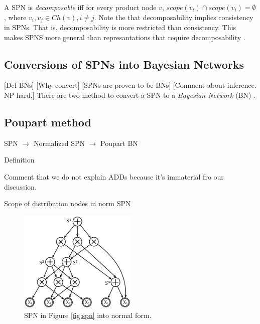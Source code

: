 A SPN is \emph{decomposable} \cite{poon2011sum} iff for every product node $v$, $scope(v_i) \cap scope(v_i) = \emptyset$, where $v_i,v_j \in Ch(v), i\neq j$. 
Note the that decomposability implies consistency in SPNs.
That is, decomposability is more restricted than consistency.
This makes SPNS more general than represantations that require decomposability \cite{poon2011sum}.

\subsection{Conversions of SPNs into Bayesian Networks}

[Def BNs]
[Why convert]
[SPNs are proven to be BNs]
[Comment about inference. NP hard.]
There are two method to convert a SPN to a \emph{Bayesian Network} (BN) \cite{pear88}.

\subsection{Poupart method}

SPN $\rightarrow$ Normalized SPN $\rightarrow$ Poupart BN

Definition

Comment that we do not explain ADDs because it's immaterial fro our discussion. 

Scope of distribution nodes in norm SPN

\begin{figure}[h]
    \begin{center}
		\includegraphics[width=0.5\textwidth]{figures/norm_SPN.png}
		\caption{SPN in Figure \ref{fig:spn} into normal form.}
	\label{fig:norm_spn}
    \end{center}
\end{figure}

